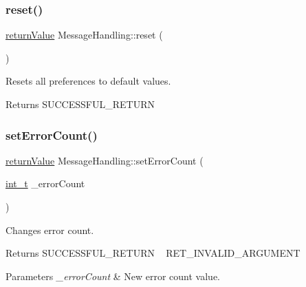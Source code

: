 \subsubsection{\texorpdfstring{reset()}{reset()}}
{\footnotesize\ttfamily \hyperlink{_message_handling_8hpp_a81d556f613bfbabd0b1f9488c0fa865e}{return\+Value} Message\+Handling\+::reset (\begin{DoxyParamCaption}{ }\end{DoxyParamCaption})}

Resets all preferences to default values. \begin{DoxyReturn}{Returns}
S\+U\+C\+C\+E\+S\+S\+F\+U\+L\+\_\+\+R\+E\+T\+U\+RN 
\end{DoxyReturn}
\mbox{\label{class_message_handling_a06e5c330c9684fc187222db061ba5a0e}} 
\subsubsection{\texorpdfstring{set\+Error\+Count()}{setErrorCount()}}
{\footnotesize\ttfamily \hyperlink{_message_handling_8hpp_a81d556f613bfbabd0b1f9488c0fa865e}{return\+Value} Message\+Handling\+::set\+Error\+Count (\begin{DoxyParamCaption}\item[{\hyperlink{_types_8hpp_ab6fd6105e64ed14a0c9281326f05e623}{int\+\_\+t}}]{\+\_\+error\+Count }\end{DoxyParamCaption})\hspace{0.3cm}{\ttfamily [inline]}}

Changes error count. \begin{DoxyReturn}{Returns}
S\+U\+C\+C\+E\+S\+S\+F\+U\+L\+\_\+\+R\+E\+T\+U\+RN ~\newline
 R\+E\+T\+\_\+\+I\+N\+V\+A\+L\+I\+D\+\_\+\+A\+R\+G\+U\+M\+E\+NT 
\end{DoxyReturn}

\begin{DoxyParams}{Parameters}
{\em \+\_\+error\+Count} & New error count value. \\
\hline
\end{DoxyParams}
\mbox{\label{class_message_handling_a31f12baabf23d05c97e2da9dbd8adf6e}} 
